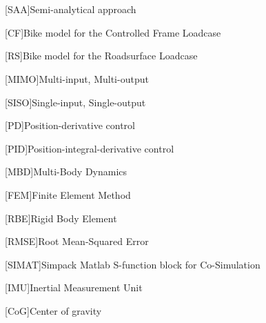 \chapter*{}



\begin{acronym}[LONGEST]
	[SAA]{Semi-analytical approach}
\end{acronym}
\begin{acronym}[LONGEST]
[CF]{Bike model for the Controlled Frame Loadcase}
\end{acronym}
\begin{acronym}[LONGEST]
	[RS]{Bike model for the Roadsurface Loadcase}
\end{acronym}
\begin{acronym}[LONGEST]
	[MIMO]{Multi-input, Multi-output}
\end{acronym}
\begin{acronym}[LONGEST]
	[SISO]{Single-input, Single-output}
\end{acronym}
\begin{acronym}[LONGEST]
	[PD]{Position-derivative control}
\end{acronym}
\begin{acronym}[LONGEST]
	[PID]{Position-integral-derivative control}
\end{acronym}
\begin{acronym}[LONGEST]
	[MBD]{Multi-Body Dynamics}
\end{acronym}
\begin{acronym}[LONGEST]
	[FEM]{Finite Element Method}
\end{acronym}
\begin{acronym}[LONGEST]
	[RBE]{Rigid Body Element}
\end{acronym}
\begin{acronym}[LONGEST]
	[RMSE]{Root Mean-Squared Error}
\end{acronym}
\begin{acronym}[LONGEST]
	[SIMAT]{Simpack Matlab S-function block for Co-Simulation}
\end{acronym}
\begin{acronym}[LONGEST]
	[IMU]{Inertial Measurement Unit}
\end{acronym}
\begin{acronym}[LONGEST]
	[CoG]{Center of gravity}
\end{acronym}

